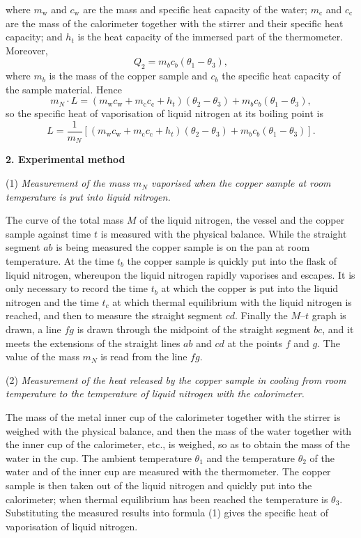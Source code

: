 where $m_{\mathrm{w}}$ and $c_{\mathrm{w}}$ are the mass and specific heat capacity of the water; $m_{\mathrm{c}}$ and $c_{\mathrm{c}}$ are the mass of the calorimeter together with the stirrer and their specific heat capacity; and $h_t$ is the heat capacity of the immersed part of the thermometer. Moreover,
\begin{equation*}
Q_2=m_bc_b(\theta_1-\theta_3),
\end{equation*}
where $m_b$ is the mass of the copper sample and $c_b$ the specific heat capacity of the sample material. Hence
\begin{equation*}
m_N\cdot L=(m_{\mathrm{w}}c_{\mathrm{w}}+m_{\mathrm{c}}c_{\mathrm{c}}+h_t)(\theta_2-\theta_3)+m_bc_b(\theta_1-\theta_3),
\end{equation*}
so the specific heat of vaporisation of liquid nitrogen at its boiling point is
\begin{equation}\tag{1}
L=\frac{1}{m_N}\left[(m_{\mathrm{w}}c_{\mathrm{w}}+m_{\mathrm{c}}c_{\mathrm{c}}+h_t)(\theta_2-\theta_3)+m_bc_b(\theta_1-\theta_3)\right].
\end{equation}

\textbf{2. Experimental method}

(1) \textit{Measurement of the mass $m_N$ vaporised when the copper sample at room temperature is put into liquid nitrogen.}

The curve of the total mass $M$ of the liquid nitrogen, the vessel and the copper sample against time $t$ is measured with the physical balance. While the straight segment $ab$ is being measured the copper sample is on the pan at room temperature. At the time $t_b$ the copper sample is quickly put into the flask of liquid nitrogen, whereupon the liquid nitrogen rapidly vaporises and escapes. It is only necessary to record the time $t_b$ at which the copper is put into the liquid nitrogen and the time $t_c$ at which thermal equilibrium with the liquid nitrogen is reached, and then to measure the straight segment $cd$. Finally the $M$--$t$ graph is drawn, a line $fg$ is drawn through the midpoint of the straight segment $bc$, and it meets the extensions of the straight lines $ab$ and $cd$ at the points $f$ and $g$. The value of the mass $m_N$ is read from the line $fg$.

(2) \textit{Measurement of the heat released by the copper sample in cooling from room temperature to the temperature of liquid nitrogen with the calorimeter.}

The mass of the metal inner cup of the calorimeter together with the stirrer is weighed with the physical balance, and then the mass of the water together with the inner cup of the calorimeter, etc., is weighed, so as to obtain the mass of the water in the cup. The ambient temperature $\theta_1$ and the temperature $\theta_2$ of the water and of the inner cup are measured with the thermometer. The copper sample is then taken out of the liquid nitrogen and quickly put into the calorimeter; when thermal equilibrium has been reached the temperature is $\theta_3$. Substituting the measured results into formula (1) gives the specific heat of vaporisation of liquid nitrogen.

